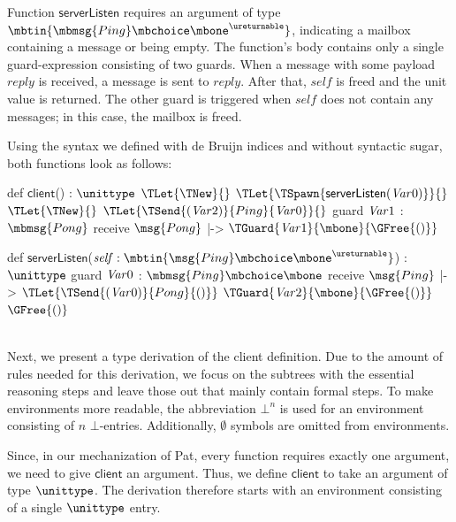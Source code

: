 Function $\textsf{serverListen}$ requires an argument of type $\mbtin{\mbmsg{Ping} \mbchoice \mbone ^ \ureturnable}$, indicating a mailbox containing a  message or being empty.
The function's body contains only a single guard-expression consisting of two guards.
When a  message with some payload $\mathit{reply}$ is received, a  message is sent to $\mathit{reply}$.
After that, $\mathit{self}$ is freed and the unit value is returned.
The other guard is triggered when $\mathit{self}$ does not contain any messages; in this case, the mailbox is freed.

Using the syntax we defined with de Bruijn indices and without syntactic sugar, both functions look as follows:

\begin{minipage}{0.45\textwidth}
\begin{pat}
def $\textsf{client}$() : $\unittype$ {
  $\TLet{\TNew}{}$
  $\TLet{\TSpawn{\textsf{serverListen}(\Var{0})}}{}$
  $\TLet{\TNew}{}$
  $\TLet{\TSend{(\Var{2})}{Ping}{\Var{0}}}{}$
  guard ${\it Var}{1}$ : $\mbmsg{Pong}$ {
    receive $\msg{Pong}$ |->
      $\TGuard{\Var{1}}{\mbone}{\GFree{()}}$
  }
}
\end{pat}
\end{minipage}\hfill
\begin{minipage}{0.45\textwidth}
\begin{pat}[firstnumber=11]
def $\textsf{serverListen}$($\mathit{self} : \mbtin{\msg{Ping} \mbchoice \mbone ^ \ureturnable}$) : $\unittype$ {
  guard ${\it Var}{0}$ : $\mbmsg{Ping} \mbchoice \mbone$ {
      receive $\msg{Ping}$ |->
        $\TLet{\TSend{(\Var{0})}{Pong}{()}}$
        $\TGuard{\Var{2}}{\mbone}{\GFree{()}}$
      $\GFree{()}$
  }
}
\end{pat}
\end{minipage}
\\

Next, we present a type derivation of the \textsf{client} definition.
Due to the amount of rules needed for this derivation, we focus on the subtrees with the essential reasoning steps and leave those out that mainly contain formal steps.
To make environments more readable, the abbreviation $\bot^n$ is used for an environment consisting of $n$ $\bot$-entries.
Additionally, $\emptyset$ symbols are omitted from environments.

Since, in our mechanization of Pat, every function requires exactly one argument, we need to give $\mathsf{client}$ an argument.
Thus, we define $\mathsf{client}$ to take an argument of type $\unittype$.
The derivation therefore starts with an environment consisting of a single $\unittype$ entry.

